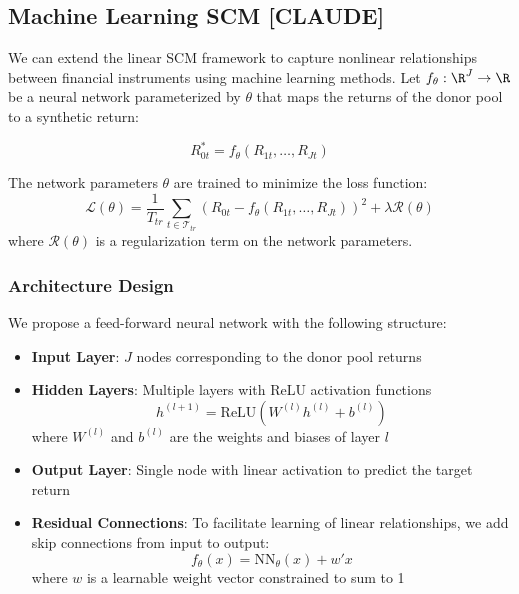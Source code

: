 \documentclass[12pt,article]{memoir}
\begin{document}

\subsection{Machine Learning SCM [CLAUDE]} 
We can extend the linear SCM framework to capture nonlinear relationships between financial instruments using machine learning methods. Let $f_{\theta}:\R^J\to\R$ be a neural network parameterized by $\theta$ that maps the returns of the donor pool to a synthetic return:

$$
R_{0t}^* = f_{\theta}(R_{1t},\ldots,R_{Jt})
$$

The network parameters $\theta$ are trained to minimize the loss function:
$$
\mathcal{L}(\theta) = \frac{1}{T_{tr}}\sum_{t\in\mathcal T_{tr}} (R_{0t} - f_{\theta}(R_{1t},\ldots,R_{Jt}))^2 + \lambda \mathcal{R}(\theta)
$$
where $\mathcal{R}(\theta)$ is a regularization term on the network parameters.

\subsubsection{Architecture Design}
We propose a feed-forward neural network with the following structure:

\begin{itemize}
   \item \textbf{Input Layer}: $J$ nodes corresponding to the donor pool returns
   \item \textbf{Hidden Layers}: Multiple layers with ReLU activation functions
   $$h^{(l+1)} = \text{ReLU}(W^{(l)}h^{(l)} + b^{(l)})$$
   where $W^{(l)}$ and $b^{(l)}$ are the weights and biases of layer $l$
   \item \textbf{Output Layer}: Single node with linear activation to predict the target return
   \item \textbf{Residual Connections}: To facilitate learning of linear relationships, we add skip connections from input to output:
   $$f_{\theta}(x) = \text{NN}_{\theta}(x) + w'x$$
   where $w$ is a learnable weight vector constrained to sum to 1
\end{itemize}
\end{document}
